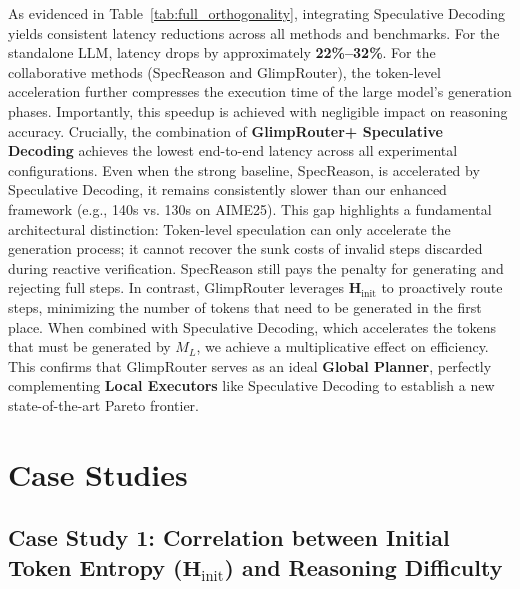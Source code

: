 \documentclass[11pt]{article}
\newcommand{\approach}{{GlimpRouter}\xspace}
\begin{document}
As evidenced in Table~\ref{tab:full_orthogonality}, integrating Speculative Decoding yields consistent latency reductions across all methods and benchmarks.
For the standalone LLM, latency drops by approximately \textbf{22\%--32\%}.
For the collaborative methods (SpecReason and \approach), the token-level acceleration further compresses the execution time of the large model's generation phases.
Importantly, this speedup is achieved with negligible impact on reasoning accuracy.
Crucially, the combination of \textbf{\approach + Speculative Decoding} achieves the lowest end-to-end latency across all experimental configurations.
Even when the strong baseline, SpecReason, is accelerated by Speculative Decoding, it remains consistently slower than our enhanced framework (e.g., 140s vs. 130s on AIME25).
This gap highlights a fundamental architectural distinction:
Token-level speculation can only accelerate the generation process; it cannot recover the sunk costs of invalid steps discarded during reactive verification.
SpecReason still pays the penalty for generating and rejecting full steps.
In contrast, \approach leverages $\mathbf{H}_\text{init}$ to proactively route steps, minimizing the number of tokens that need to be generated in the first place. When combined with Speculative Decoding, which accelerates the tokens that must be generated by $M_L$, we achieve a multiplicative effect on efficiency.
This confirms that \approach serves as an ideal \textbf{Global Planner}, perfectly complementing \textbf{Local Executors} like Speculative Decoding to establish a new state-of-the-art Pareto frontier.




\section{Case Studies}
\label{app:case_studies}

\subsection{Case Study 1: Correlation between Initial Token Entropy (\texorpdfstring{$\mathbf{H}_\text{init}$}{H init}) and Reasoning Difficulty}
\end{document}
